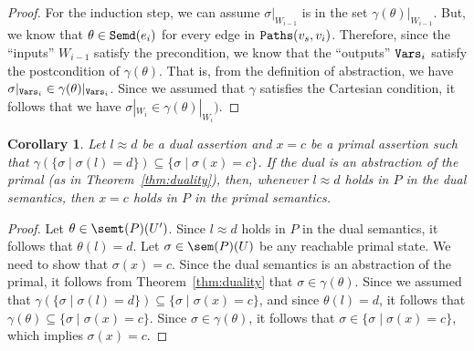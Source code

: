 \documentclass[preprint]{sig-alternate-05-2015}
\newtheorem{corollary}{Corollary}
\def\semd{{\tt{Semd}}}
\def\ds{{\mathit{\theta}}}   %
\def\paths{{\tt{Paths}}}
\def\V{{\tt{Vars}}}
\begin{document}
{\begin{proof}
  For the induction step, %
  we can assume
  $\sigma|_{W_{i-1}}$ is in the set $\gamma(\ds)|_{W_{i-1}}$.
  But, we know that $\ds\in \semd(e_i)$ for every edge in $\paths(v_s,v_i)$.
  Therefore, since the ``inputs'' $W_{i-1}$ satisfy the precondition,
  we know that the ``outputs'' $\V_i$ satisfy the postcondition of $\gamma(\ds)$.
  That is, from the definition of abstraction,
  we have $\sigma|_{\V_i} \in \gamma(\ds)|_{\V_i}$.
  Since we assumed that $\gamma$ satisfies the Cartesian condition,
  it follows that
  we have $\sigma|_{W_i} \in \gamma(\ds)|_{W_i})$.
\end{proof}

\begin{corollary}\label{cor:duality}
  Let $l\approx d$ be a dual assertion and $x=c$ be a primal assertion
  such that $\gamma(\{\sigma \mid \sigma(l)=d\}) \subseteq \{\sigma \mid \sigma(x)=c\}$.
  If the dual is an abstraction of the primal (as in Theorem~\ref{thm:duality}),
  then, whenever
  $l \approx d$ holds in $P$ in the dual semantics, then
  $x = c$ holds in $P$ in the primal semantics.
\end{corollary}
\begin{proof}
  Let $\ds\in\semt(P)(U')$.
  Since $l\approx d$ holds in $P$ in the dual semantics,
  it follows that $\ds(l)=d$.
  Let $\sigma\in\sem(P)(U)$ be any reachable primal state.
  We need to show that $\sigma(x)=c$.
  Since the dual semantics is an abstraction of the primal,
  it follows from Theorem~\ref{thm:duality} that
  $\sigma\in\gamma(\ds)$.
  Since we assumed that
  $\gamma(\{\sigma \mid \sigma(l)=d\}) \subseteq \{\sigma \mid \sigma(x)=c\}$,
  and since $\ds(l)=d$,
  it follows that
  $\gamma(\ds) \subseteq \{\sigma \mid \sigma(x)=c\}$.
  Since $\sigma\in\gamma(\ds)$,
  it follows that $\sigma\in \{\sigma \mid \sigma(x)=c\}$,
  which implies $\sigma(x)=c$.
\end{proof}
\endignore}
\end{document}
